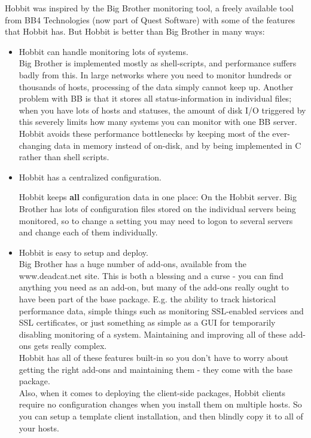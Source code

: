  Hobbit was inspired by the Big Brother monitoring tool, a freely available tool from BB4 Technologies (now part of Quest Software) with some of the features that Hobbit has. But Hobbit is better than Big Brother in many ways:
\begin{itemize}
\item Hobbit can handle monitoring lots of systems.\\ 


 Big Brother is implemented mostly as shell-scripts, and performance suffers badly from this. In large networks where you need to monitor hundreds or thousands of hosts, processing of the data simply cannot keep up. Another problem with BB is that it stores all status-information in individual files; when you have lots of hosts and statuses, the amount of disk I/O triggered by this severely limits how many systems you can monitor with one BB server.\\ 
 Hobbit avoids these performance bottlenecks by keeping most of the ever-changing data in memory instead of on-disk, and by being implemented in C rather than shell scripts.

\item Hobbit has a centralized configuration. 

 Hobbit keeps \textbf{all}
 configuration data in one place: On the Hobbit server. Big Brother has lots of configuration files stored on the individual servers being monitored, so to change a setting you may need to logon to several servers and change each of them individually.

\item Hobbit is easy to setup and deploy.\\ 


 Big Brother has a huge number of add-ons, available from the www.deadcat.net site. This is both a blessing and a curse - you can find anything you need as an add-on, but many of the add-ons really ought to have been part of the base package. E.g. the ability to track historical performance data, simple things such as monitoring SSL-enabled services and SSL certificates, or just something as simple as a GUI for temporarily disabling monitoring of a system. Maintaining and improving all of these add-ons gets really complex.\\ 
 Hobbit has all of these features built-in so you don't have to worry about getting the right add-ons and maintaining them - they come with the base package.\\ 
 Also, when it comes to deploying the client-side packages, Hobbit clients require no configuration changes when you install them on multiple hosts. So you can setup a template client installation, and then blindly copy it to all of your hosts.


\end{itemize}
